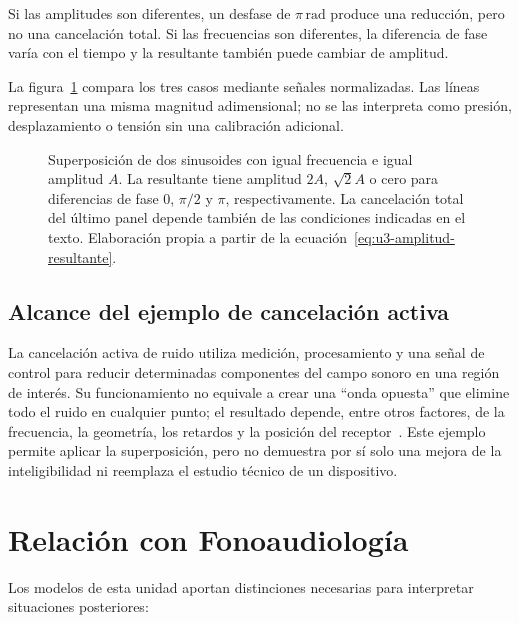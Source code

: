 Si las amplitudes son diferentes, un desfase de \(\pi\,\text{rad}\) produce
una reducción, pero no una cancelación total. Si las frecuencias son
diferentes, la diferencia de fase varía con el tiempo y la resultante también
puede cambiar de amplitud.

La figura~\ref{fig:u3-superposicion-desfase} compara los tres casos mediante
señales normalizadas. Las líneas representan una misma magnitud adimensional;
no se las interpreta como presión, desplazamiento o tensión sin una
calibración adicional.

\begin{figure}[htbp]
    \centering
    
    \caption{Superposición de dos sinusoides con igual frecuencia e igual
    amplitud \(A\). La resultante tiene amplitud \(2A\),
    \(\sqrt{2}A\) o cero para diferencias de fase \(0\),
    \(\pi/2\) y \(\pi\), respectivamente. La cancelación total del último
    panel depende también de las condiciones indicadas en el texto.
    Elaboración propia a partir de la
    ecuación~\eqref{eq:u3-amplitud-resultante}.}
    \label{fig:u3-superposicion-desfase}
\end{figure}

\subsection{Alcance del ejemplo de cancelación activa}
\label{sec:u3-anc}

La cancelación activa de ruido utiliza medición, procesamiento y una
señal de control para reducir determinadas componentes del campo sonoro en una
región de interés. Su funcionamiento no equivale a crear una ``onda opuesta''
que elimine todo el ruido en cualquier punto; el resultado depende, entre
otros factores, de la frecuencia, la geometría, los retardos y la posición del
receptor~\cite{moser2009}. Este ejemplo permite aplicar la superposición, pero no demuestra
por sí solo una mejora de la inteligibilidad ni reemplaza el estudio técnico
de un dispositivo.

\section{Relación con Fonoaudiología}
\label{sec:u3-fonoaudiologia}

Los modelos de esta unidad aportan distinciones necesarias para interpretar
situaciones posteriores:

